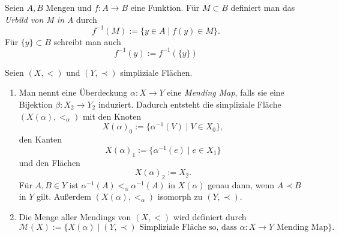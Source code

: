 \documentclass[12pt,titlepage]{article}
\begin{document}
\begin{bemerkung}
Seien $A,B$ Mengen und $f:A \to B$ eine Funktion. Für $M \subset B$ definiert man das \emph{Urbild von M in A} durch 
\[
f^{-1}(M):=\{y\in A \mid f(y)\in M\}.
\]
Für $\{y\} \subset B$ schreibt man auch
\[
f^{-1}(y):=f^{-1}(\{y\})
\]
\end{bemerkung}
  \begin{definition}
  Seien $(X,<)$ und $(Y,\prec)$ simpliziale Flächen.
  \begin{enumerate}
  \item Man nennt eine Überdeckung $\alpha:X \to Y$ eine \emph{Mending Map}, falls sie eine Bijektion $\beta : X_{2}\to Y_{2}$ induziert. Dadurch entsteht die simpliziale Fläche $(X(\alpha),<_{\alpha})$ mit den Knoten
  \[
X(\alpha)_0:=\{\alpha^{-1}(V)\mid V \in X_0 \},
  \] 
  den Kanten 
  \[
X(\alpha)_1:=\{\alpha^{-1}(e)\mid e \in X_1 \} 
  \]
 und den Flächen 
  \[
X(\alpha)_2:=X_2  .
  \]
  Für $A,B \in Y$ ist $\alpha^{-1}(A)<_{\alpha}\alpha^{-1}(A)$ in $X(\alpha)$ genau dann, wenn $A \prec B  $ in $Y$ gilt. Außerdem $(X(\alpha),<_{\alpha})$ isomorph zu $(Y,\prec)$.

  \item Die Menge aller Mendings von $(X,<)$ wird definiert durch 
\[
\mathcal{M}(X):=\{X(\alpha )\mid
 \text{$(Y,\prec )$ Simpliziale Fläche so, dass  $\alpha : X \to Y$ Mending Map}
 \}  .
\]

  \end{enumerate}
  \end{definition}
  
\end{document}
